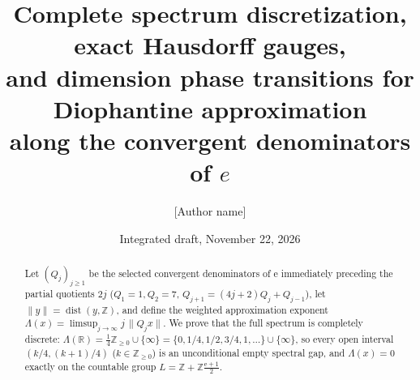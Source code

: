 \documentclass[11pt]{article}
\title{Complete spectrum discretization, exact Hausdorff gauges,\\
and dimension phase transitions for Diophantine approximation\\
along the convergent denominators of \texorpdfstring{$e$}{e}}
\author{[Author name]\\ \relax[Affiliation]}
\date{Integrated draft, November 22, 2026}
\theoremstyle{definition}
\theoremstyle{remark}
\newcommand{\R}{\mathbb{R}}
\newcommand{\Z}{\mathbb{Z}}
\newcommand{\ee}{\mathrm{e}}
\newcommand{\dist}{\operatorname{dist}}
\newcommand{\Lam}{\Lambda}
\begin{document}
\maketitle

\begin{abstract}
Let $(Q_j)_{j\ge1}$ be the selected convergent denominators of $\ee$
immediately preceding the partial quotients $2j$
($Q_1=1,Q_2=7$, $Q_{j+1}=(4j+2)Q_j+Q_{j-1}$), let $\|y\|=\dist(y,\Z)$, and
define the weighted approximation exponent
$\Lam(x)=\limsup_{j\to\infty} j\,\|Q_j x\|$. We prove that the full spectrum is
completely discrete:
$\Lam(\R)=\frac14\Z_{\ge0}\cup\{\infty\}=\{0,1/4,1/2,3/4,1,\dots\}\cup\{\infty\}$,
so every open interval $(k/4,(k+1)/4)$ ($k\in\Z_{\ge0}$) is an unconditional
empty spectral gap, and $\Lam(x)=0$ exactly on the countable group
$L=\Z+\Z\frac{\ee+1}{2}$.


\end{abstract}
\end{document}
